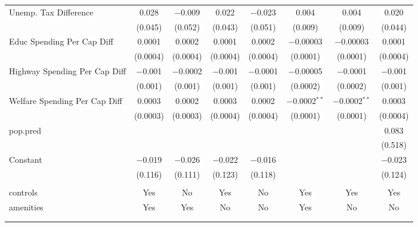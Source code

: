 \begin{table}[!htbp]
\begin{tabular}{@{\extracolsep{5pt}}lccccccc}
  Unemp. Tax Difference & 0.028 & $-$0.009 & 0.022 & $-$0.023 & 0.004 & 0.004 & 0.020 \\ 
  & (0.045) & (0.052) & (0.043) & (0.051) & (0.009) & (0.009) & (0.044) \\ 
  Educ Spending Per Cap Diff & 0.0001 & 0.0002 & 0.0001 & 0.0002 & $-$0.00003 & $-$0.00003 & 0.0001 \\ 
  & (0.0004) & (0.0004) & (0.0004) & (0.0004) & (0.0001) & (0.0001) & (0.0004) \\ 
  Highway Spending Per Cap Diff & $-$0.001 & $-$0.0002 & $-$0.001 & $-$0.0001 & $-$0.00005 & $-$0.0001 & $-$0.001 \\ 
  & (0.001) & (0.001) & (0.001) & (0.001) & (0.0002) & (0.0002) & (0.001) \\ 
  Welfare Spending Per Cap Diff & 0.0003 & 0.0002 & 0.0003 & 0.0002 & $-$0.0002$^{**}$ & $-$0.0002$^{**}$ & 0.0003 \\ 
  & (0.0003) & (0.0003) & (0.0004) & (0.0004) & (0.0001) & (0.0001) & (0.0004) \\ 
  pop.pred &  &  &  &  &  &  & 0.083 \\ 
  &  &  &  &  &  &  & (0.518) \\ 
  Constant & $-$0.019 & $-$0.026 & $-$0.022 & $-$0.016 &  &  & $-$0.023 \\ 
  & (0.116) & (0.111) & (0.123) & (0.118) &  &  & (0.124) \\ 
 \hline \\[-1.8ex] 
controls & Yes & No & Yes & No & Yes & Yes & Yes \\ 
amenities & Yes & Yes & No & No & Yes & No & No \\ 
\hline \\[-1.8ex] 
\hline 
\hline \\[-1.8ex] 
\end{tabular} 
\end{table} 
